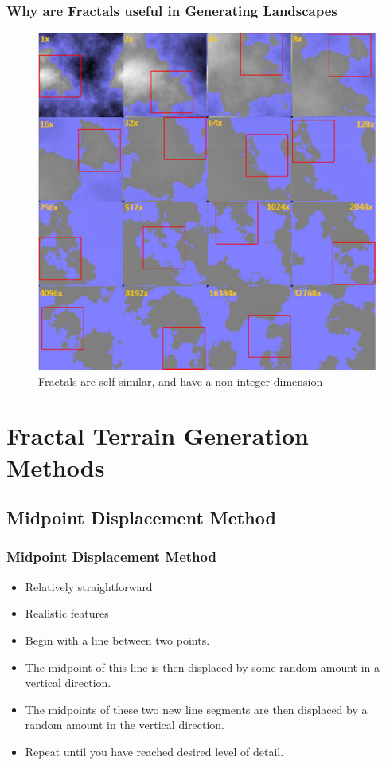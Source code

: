\documentclass{beamer}
\begin{document}
\begin{frame}
\frametitle{Why are Fractals useful in Generating Landscapes}
\begin{center}
\begin{figure}[h]
\includegraphics[scale=0.13]{SelfSimilarity.jpg}
\caption{Fractals are self-similar, and have a non-integer dimension}
\label{fig:selfsimilar}
\end{figure}
\end{center}
\end{frame}


\section{Fractal Terrain Generation Methods}
\subsection{Midpoint Displacement Method}

\begin{frame}
  \frametitle{Midpoint Displacement Method}
\begin{itemize}
 \item Relatively straightforward
 \item Realistic features
\item Begin with a line between two points.
\item The midpoint of this line is then displaced by some random amount in a vertical direction.
\item The midpoints of these two new line segments are then displaced by a random amount in the vertical direction.
\item Repeat until you have reached desired level of detail.
\end{itemize}
\end{frame}
\end{document}
